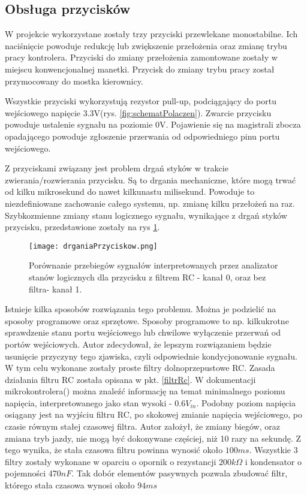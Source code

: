 \subsection{Obsługa przycisków}
W projekcie wykorzystane zostały trzy przyciski przewlekane monostabilne. Ich naciśnięcie powoduje redukcję lub zwiększenie przełożenia oraz zmianę trybu pracy kontrolera. Przyciski do zmiany przełożenia zamontowane zostały w miejscu konwencjonalnej manetki. Przycisk do zmiany trybu pracy został przymocowany do mostka kierownicy.

Wszystkie przyciski wykorzystują rezystor pull-up, podciągający do portu wejściowego napięcie 3.3V(rys. \ref{fig:schematPolaczen}). Zwarcie przycisku powoduje ustalenie sygnału na poziomie 0V. Pojawienie się na magistrali zbocza opadającego powoduje zgłoszenie przerwania od odpowiedniego pinu portu wejściowego. 

Z przyciskami związany jest problem drgań styków w trakcie zwierania/rozwierania przycisku. Są to drgania mechaniczne, które mogą trwać od kilku mikrosekund do nawet kilkunastu milisekund. Powoduje to niezdefiniowane zachowanie całego systemu, np. zmianę kilku przełożeń na raz. Szybkozmienne zmiany stanu logicznego sygnału, wynikające z drgań styków przycisku, przedstawione zostały na rys \ref{fig:drganiaPrzyciskow}.
\begin{figure}[h]
    \centering
    \texttt{[image: drganiaPrzyciskow.png]}
    \caption{Porównanie przebiegów sygnałów interpretowanych przez analizator stanów logicznych dla przycisku z filtrem RC - kanał 0, oraz bez filtra- kanał 1.}
    \label{fig:drganiaPrzyciskow}
\end{figure}
Istnieje kilka sposobów rozwiązania tego problemu. Można je podzielić na sposoby programowe oraz sprzętowe. Sposoby programowe to np. kilkukrotne sprawdzenie stanu portu wejściowego lub chwilowe wyłączenie przerwań od portów wejściowych. Autor zdecydował, że lepszym rozwiązaniem będzie usunięcie przyczyny tego zjawiska, czyli odpowiednie kondycjonowanie sygnału. W tym celu wykonane zostały proste filtry dolnoprzepustowe RC. Zasada działania filtru RC została opisana w pkt. \ref{filtrRc}. W dokumentacji mikrokontrolera(\cite{tiva}) można znaleźć informację na temat minimalnego poziomu napięcia, interpretowanego jako stan wysoki - $0.6V_{in}$. Podobny poziom napięcia osiągany jest na wyjściu filtru RC, po skokowej zmianie napięcia wejściowego, po czasie równym stałej czasowej filtra. Autor założył, że zmiany biegów, oraz zmiana tryb jazdy, nie mogą być dokonywane częściej, niż 10 razy na sekundę. Z tego wynika, że stała czasowa filtru powinna wynosić około $100ms$. Wszystkie 3 filtry zostały wykonane w oparciu o opornik o rezystancji $200k\Omega$ i kondensator o pojemności 470$nF$. Tak dobór elementów pasywnych pozwala zbudować filtr, którego stała czasowa wynosi około $94ms$ 
